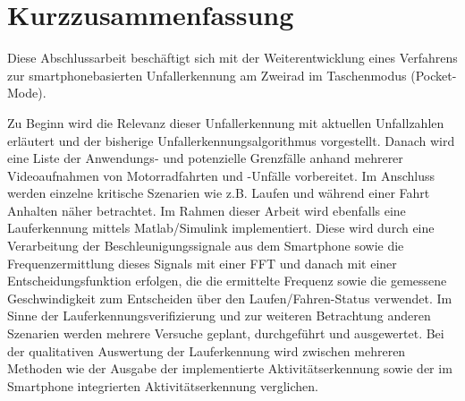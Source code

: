 \chapter*{Kurzzusammenfassung}
%
%
%
%
%
%
%
%
%
%
%
%

Diese Abschlussarbeit beschäftigt sich mit der Weiterentwicklung eines Verfahrens zur smartphonebasierten Unfallerkennung am Zweirad im Taschenmodus (Pocket-Mode). 

Zu Beginn wird die Relevanz dieser Unfallerkennung mit aktuellen Unfall\-zahlen er\-läut\-ert und der bisherige Unfallerkennungsalgorithmus vorgestellt.
Danach wird eine Liste der Anwendungs- und potenzielle Grenzfälle anhand mehrerer Videoaufnahmen von Motorradfahrten und -Unfälle vorbereitet. Im Anschluss werden einzelne kritische Szenarien wie z.B. Laufen und während einer Fahrt Anhalten näher betrachtet.
Im Rahmen dieser Arbeit wird ebenfalls eine Lauferkennung mittels Matlab/Simulink implementiert. Diese wird durch eine Verarbeitung der Beschleunigungssignale aus dem Smartphone sowie die Frequenzermittlung dieses Signals mit einer FFT und danach mit einer Entscheidungsfunktion erfolgen, die die ermittelte Frequenz sowie die gemessene Geschwindigkeit zum Entscheiden über den Laufen/Fahren-Status verwendet.
Im Sinne der Lauferkennungsverifizierung und zur weiteren Betrachtung anderen Szenarien werden mehrere Versuche geplant, durchgeführt und ausgewertet.
Bei der qualitativen Auswertung der Lauferkennung wird zwischen mehreren Methoden wie der Ausgabe der implementierte Aktivitätserkennung sowie der im Smartphone integrierten Aktivitätserkennung verglichen. 
%
%
\begingroup %
\let\cleardoublepage\relax
